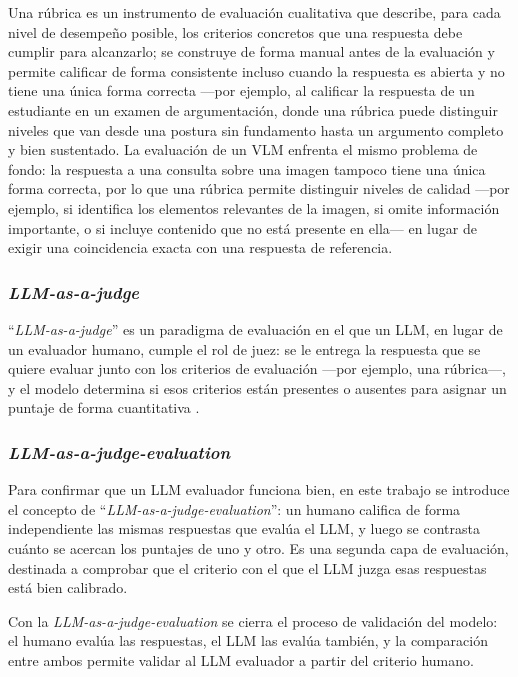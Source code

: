 Una rúbrica es un instrumento de evaluación cualitativa que describe, para cada nivel de desempeño posible, los criterios concretos que una respuesta debe cumplir para alcanzarlo; se construye de forma manual antes de la evaluación y permite calificar de forma consistente incluso cuando la respuesta es abierta y no tiene una única forma correcta —por ejemplo, al calificar la respuesta de un estudiante en un examen de argumentación, donde una rúbrica puede distinguir niveles que van desde una postura sin fundamento hasta un argumento completo y bien sustentado. La evaluación de un VLM enfrenta el mismo problema de fondo: la respuesta a una consulta sobre una imagen tampoco tiene una única forma correcta, por lo que una rúbrica permite distinguir niveles de calidad —por ejemplo, si identifica los elementos relevantes de la imagen, si omite información importante, o si incluye contenido que no está presente en ella— en lugar de exigir una coincidencia exacta con una respuesta de referencia.

\subsubsection{\textit{LLM-as-a-judge}}

``\textit{LLM-as-a-judge}'' es un paradigma de evaluación en el que un LLM, en lugar de un evaluador humano, cumple el rol de juez: se le entrega la respuesta que se quiere evaluar junto con los criterios de evaluación —por ejemplo, una rúbrica—, y el modelo determina si esos criterios están presentes o ausentes para asignar un puntaje de forma cuantitativa \cite{zheng2023llmasjudge}.

\subsubsection{\textit{LLM-as-a-judge-evaluation}}

Para confirmar que un LLM evaluador funciona bien, en este trabajo se introduce el concepto de ``\textit{LLM-as-a-judge-evaluation}'': un humano califica de forma independiente las mismas respuestas que evalúa el LLM, y luego se contrasta cuánto se acercan los puntajes de uno y otro. Es una segunda capa de evaluación, destinada a comprobar que el criterio con el que el LLM juzga esas respuestas está bien calibrado.

Con la \textit{LLM-as-a-judge-evaluation} se cierra el proceso de validación del modelo: el humano evalúa las respuestas, el LLM las evalúa también, y la comparación entre ambos permite validar al LLM evaluador a partir del criterio humano.

